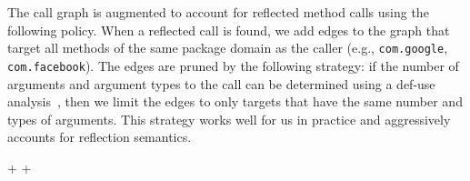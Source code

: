 The call graph is augmented to account for reflected
method calls using the following policy.  When a
reflected call is found, we add edges to the graph that target all
methods of the same package domain as the caller (e.g.,
\lstinline!com.google!, \lstinline!com.facebook!).  The edges are pruned by the
following strategy: if the number of arguments and argument types to
the call can be determined using a def-use analysis~\cite{Aho2006},
then we limit the edges to only targets that have the same number and
types of arguments.  This strategy works well for us in
practice and aggressively accounts for reflection semantics.



\lstDeleteShortInline+
\lstMakeShortInline[basicstyle=\scriptsize\ttfamily,keywordstyle=\color{DarkPurple},breaklines=true]+

\begin{table}[t]
\small
\renewcommand*{\arraystretch}{1.3}
\caption{Considered UI Elements.}
\label{tbl:ui}
\centering
\tabcolsep=1.5pt
\end{table}

